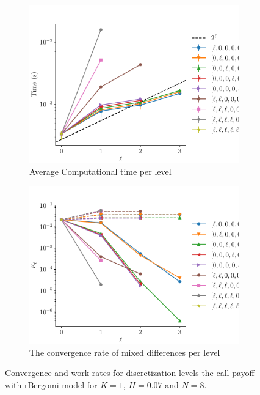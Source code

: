 \documentclass[11pt]{article}
\begin{document}
\begin{figure}[!h]
	\centering
	\begin{subfigure}{.4\textwidth}
		\centering
		\includegraphics[width=0.95\linewidth]{./figures/bergomi_misc/non_hierarchical/H_007/N_8/level_work.pdf}
		\caption{Average Computational time per level}
		\label{fig:misc_rbergomi_8_steps_sub3}
	\end{subfigure}%
	\begin{subfigure}{.4\textwidth}
		\centering
		\includegraphics[width=0.95\linewidth]{./figures/bergomi_misc/non_hierarchical/H_007/N_8/levels_error_rate.pdf}
		\caption{  The convergence rate of mixed differences per level}
		\label{fig:misc_rbergomi_8_steps_sub4}
	\end{subfigure}%
	\caption{Convergence and work rates for discretization levels  the call payoff with rBergomi model for $K=1$, $H=0.07$ and $N=8$.}
	\label{fig:misc_rbergomi_8_steps_2}
\end{figure}
\end{document}
